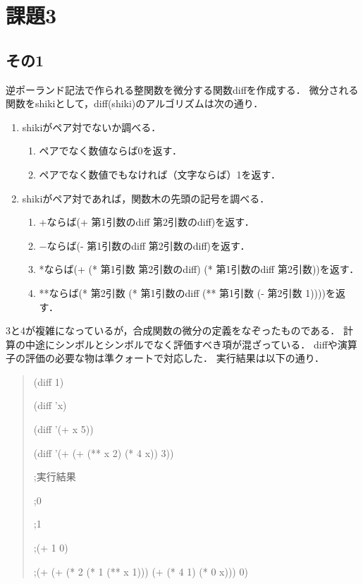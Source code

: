 \section{課題3}

\subsection{その1}
逆ポーランド記法で作られる整関数を微分する関数diffを作成する．
微分される関数をshikiとして，diff(shiki)のアルゴリズムは次の通り．

\begin{enumerate}
\item shikiがペア対でないか調べる．
  \begin{enumerate}
  \item ペアでなく数値ならば0を返す．
  \item ペアでなく数値でもなければ（文字ならば）1を返す．
  \end{enumerate}
\item shikiがペア対であれば，関数木の先頭の記号を調べる．
  \begin{enumerate}
  \item +ならば(+ 第1引数のdiff 第2引数のdiff)を返す．
  \item −ならば(- 第1引数のdiff 第2引数のdiff)を返す．
  \item *ならば(+ (* 第1引数 第2引数のdiff) (* 第1引数のdiff 第2引数))を返す． 
  \item **ならば(* 第2引数 (* 第1引数のdiff (** 第1引数 (- 第2引数 1))))を返す．
  \end{enumerate}
\end{enumerate}

3と4が複雑になっているが，合成関数の微分の定義をなぞったものである．
計算の中途にシンボルとシンボルでなく評価すべき項が混ざっている．
diffや演算子の評価の必要な物は準クォートで対応した．
実行結果は以下の通り．

\begin{quote}
  
  (diff 1)
  
  (diff 'x)
  
  (diff '(+ x 5))
  
  (diff '(+ (+ (** x 2) (* 4 x)) 3))

  ;実行結果

  ;0
  
  ;1
  
  ;(+ 1 0)
  
  ;(+ (+ (* 2 (* 1 (** x 1))) (+ (* 4 1) (* 0 x))) 0)

\end{quote}

